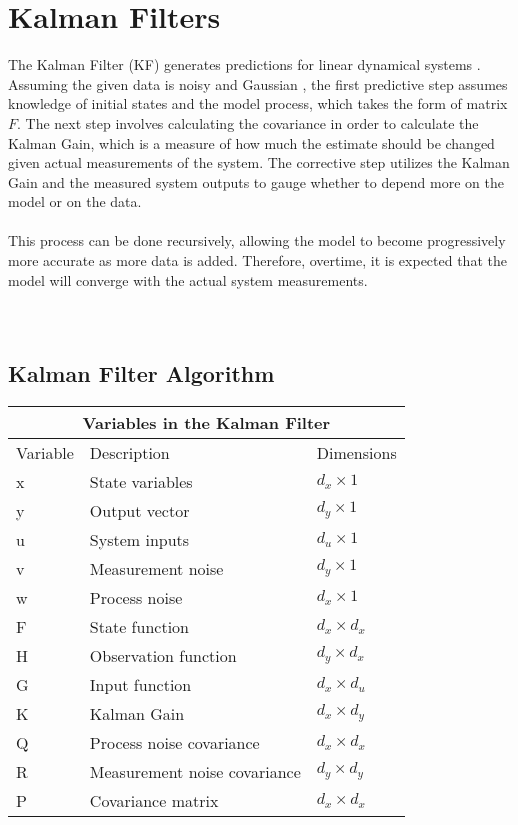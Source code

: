 \chapter{Kalman Filters}
\label{Kalman Filters}

The Kalman Filter (KF) generates predictions for linear dynamical systems \cite{inbook}. Assuming the given data is noisy and Gaussian \cite{inproceedings, article7}, the first predictive step assumes knowledge of initial states and the model process, which takes the form of matrix $F$. The next step involves calculating the covariance in order to calculate the Kalman Gain, which is a measure of how much the estimate should be changed given actual measurements of the system. The corrective step utilizes the Kalman Gain and the measured system outputs to gauge whether to depend more on the model or on the data.  \\ \\
This process can be done recursively, allowing the model to become progressively more accurate as more data is added. Therefore, overtime, it is expected that the model will converge with the actual system measurements.
\\ \\ \\

\section{Kalman Filter Algorithm}
\begin{center}
\centering
\begin{tabular}{ |p{2cm}||p{5cm}|p{2cm}| }
    \hline
    \multicolumn{3}{|c|}{Variables in the Kalman Filter } \\ 
    \hline
    Variable & Description & Dimensions \\
    \hline
    x & State variables  & $d_x \times 1$ \\
    y & Output vector  & $d_y \times 1$ \\
    u & System inputs  & $d_u \times 1$\\
    v & Measurement noise & $d_y \times 1$\\
    w & Process noise & $d_x \times 1$\\
    F & State function  & $d_x \times d_x $  \\ 
    H & Observation function & $d_y \times d_x$\\
    G & Input function & $d_x \times d_u$\\
    K & Kalman Gain  & $d_x \times d_y$\\
    Q & Process noise covariance  & $d_x \times d_x$ \\
    R & Measurement noise covariance &  $d_y \times d_y$\\
    P & Covariance matrix & $d_x \times d_x $  \\ 
    
    \hline
\end{tabular}
\end{center} 


